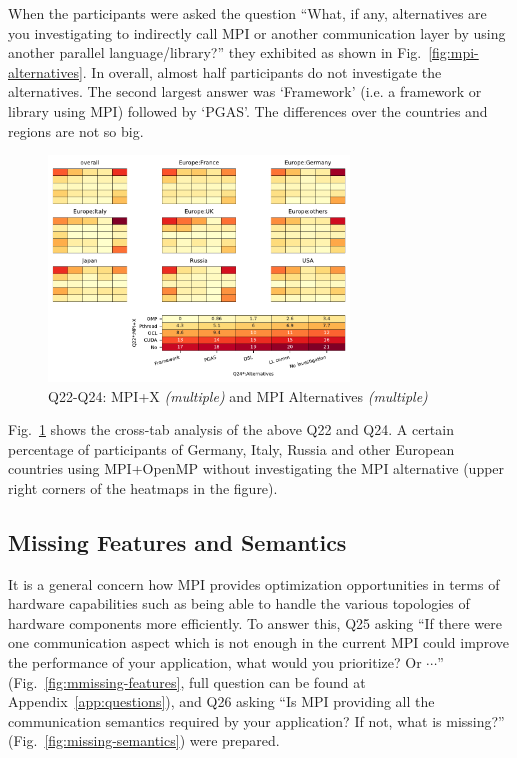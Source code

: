 \documentclass[conference,10pt,letterpaper]{IEEEtran}
\def\myquote#1{`#1'}
\begin{document}
When the participants were asked the question ``What, if any,
alternatives are you investigating to indirectly call MPI or another
communication layer by using another parallel language/library?'' they
exhibited as shown in Fig.~\ref{fig:mpi-alternatives}. In overall,
almost half participants do not investigate the alternatives. The second
largest answer was \myquote{Framework} (i.e. a framework or library
using MPI) followed by \myquote{PGAS}. The
differences over the countries and regions are not so big. 
  
\begin{figure}[htb]
\begin{center}
\includegraphics[width=8cm]{Figs/Q22-Q24.pdf}
\caption{Q22-Q24: MPI+X {\it(multiple)} and MPI Alternatives {\it(multiple)}}
\label{fig:mpi-x-and-alternatives}
\end{center}
\end{figure}

Fig.~\ref{fig:mpi-x-and-alternatives} shows the cross-tab analysis of
the above Q22 and Q24. A certain percentage of participants of
Germany, Italy, Russia and other European countries using MPI+OpenMP
without investigating the MPI alternative (upper right corners of the
heatmaps in the figure). 

\subsection{Missing Features and Semantics}

It is a general concern how MPI provides optimization
opportunities in terms of hardware capabilities such as being able to
handle the various topologies of hardware components more 
efficiently. To answer this, Q25 asking ``If there were one
communication aspect which is not enough in the current MPI could
improve the performance of your application, what would you
prioritize? Or $\cdots$'' (Fig.~\ref{fig:mmissing-features}, full
question can be found at Appendix~\ref{app:questions}), and Q26 asking
``Is MPI providing all the communication semantics required by your
application? If not, what is missing?''
(Fig.~\ref{fig:missing-semantics}) were prepared. 
\end{document}
